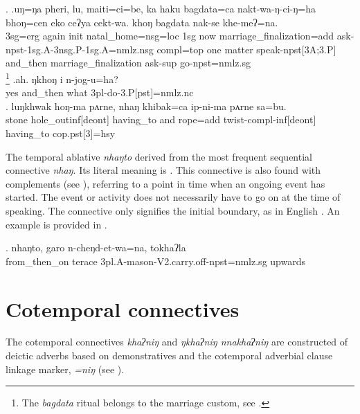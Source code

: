 \ex. \ag.uŋ=ŋa pheri, lu, maiti=ci=be, ka haku bagdata=ca nakt-wa-ŋ-ci-ŋ=ha bhoŋ=cen eko ceʔya cekt-wa. khoŋ bagdata  nak-se khe-meʔ=na.\\
{\sc 3sg=erg} again {\sc init} natal\_home{\sc =nsg=loc} {\sc 1sg} now marriage\_finalization{\sc =add} ask{\sc -npst-1sg.A-3nsg.P-1sg.A=nmlz.nsg} {\sc compl=top} one matter speak{\sc -npst[3A;3.P]} and\_then marriage\_finalization ask{\sc -sup} go{\sc [3]-npst=nmlz.sg}\\
\footnote{The \emph{bagdata} ritual belongs to the  marriage custom, see .} 
\bg.ah.    ŋkhoŋ    i    n-jog-u=ha?\\
yes and\_then what {\sc 3pl-}do{\sc -3.P[pst]=nmlz.nc}\\
 
\bg. luŋkhwak hoŋ-ma                pʌrne, nhaŋ     khibak=ca        ip-ni-ma                       pʌrne    sa=bu.\\
stone hole\_out{\sc inf[deont]} having\_to and rope{\sc =add} twist{\sc -compl-inf[deont]} having\_to {\sc cop.pst[3]=hsy}\\
 


The  temporal ablative \emph{nhaŋto} derived from the most frequent sequential connective \emph{nhaŋ}. Its literal meaning is . This connective is also found with complements (see ), referring to a point in time when an ongoing event has started. The event or activity does not necessarily have to go on at the time of speaking. The connective only signifies the initial boundary, as in English . An example is provided in \Next.
 
\exg. nhaŋto, garo    n-cheŋd-et-wa=na,                             tokhaʔla\\
from\_then\_on terace {\sc 3pl.A-}mason{\sc -V2.carry.off-npst=nmlz.sg} upwards\\
 

\section{Cotemporal connectives} 

The cotemporal connectives \emph{khaʔniŋ} and \emph{ŋkhaʔniŋ \ti nnakhaʔniŋ} are constructed of deictic adverbs based on demonstratives and the cotemporal adverbial clause linkage marker, \emph{=niŋ} (see \Next).

